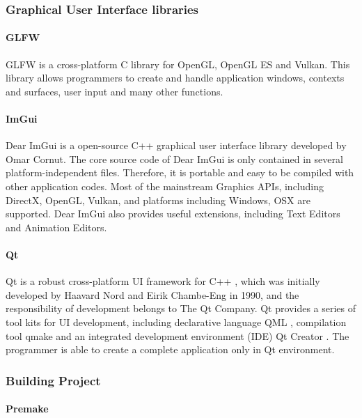 \subsubsection{Graphical User Interface libraries}

\paragraph{GLFW}

GLFW \cite{glfw} is a cross-platform C library for OpenGL, OpenGL ES and Vulkan. This library allows programmers to create and handle application windows, contexts and surfaces, user input and many other functions.

\paragraph{ImGui}

Dear ImGui \cite{dearimgui} is a open-source C++ graphical user interface library developed by Omar Cornut. The core source code of Dear ImGui is only contained in several platform-independent files. Therefore, it is portable and easy to be compiled with other application codes. Most of the mainstream Graphics APIs, including DirectX, OpenGL, Vulkan, and platforms including Windows, OSX are supported. Dear ImGui also provides useful extensions, including Text Editors and Animation Editors.

\paragraph{Qt}

Qt \cite{qt} is a robust cross-platform UI framework for C++ \cite{sherriff2018qt}, which was initially developed by Haavard Nord and Eirik Chambe-Eng in 1990, and the responsibility of development belongs to The Qt Company. Qt provides a series of tool kits for UI development, including declarative language QML \cite{qml}, compilation tool qmake \cite{qmake} and an integrated development environment (IDE) Qt Creator \cite{qtcreator}. The programmer is able to create a complete application only in Qt environment. 

\subsubsection{Building Project}

\paragraph{Premake}
\label{premake}

